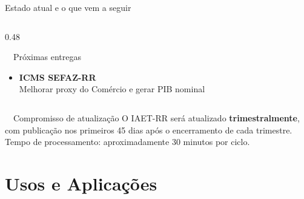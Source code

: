 \documentclass[aspectratio=169, 11pt]{beamer}
\begin{document}
\begin{frame}{Estado atual e o que vem a seguir}
\begin{columns}[T]
\begin{column}{0.48\textwidth}
\begin{alertblock}{\faTools\ \ Próximas entregas}
\begin{itemize}
          \vspace{0.1cm}
          \item[\color{seplangold}\faClock] \textbf{ICMS SEFAZ-RR}\\
                {\small Melhorar proxy do Comércio e gerar PIB nominal}
        \end{itemize}
      \end{alertblock}
    \end{column}
  \end{columns}

  \vspace{0.3cm}

  \begin{block}{\faLightbulb\ \ Compromisso de atualização}
    O IAET-RR será atualizado \textbf{trimestralmente}, com publicação nos
    primeiros 45 dias após o encerramento de cada trimestre. Tempo de
    processamento: aproximadamente 30 minutos por ciclo.
  \end{block}

\end{frame}

\section{Usos e Aplicações}
\end{document}
